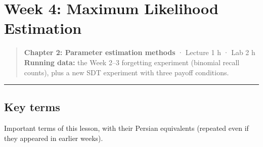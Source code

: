 \section{Week 4: Maximum Likelihood Estimation}

\begin{quote}
\textbf{Chapter 2: Parameter estimation methods} · Lecture 1 h · Lab 2 h
\textbf{Running data:} the Week 2--3 forgetting experiment (binomial
recall counts), plus a new SDT experiment with three payoff conditions.
\end{quote}

\begin{center}\rule{0.5\linewidth}{0.5pt}\end{center}

\subsection{Key terms}

Important terms of this lesson, with their Persian equivalents (repeated
even if they appeared in earlier weeks).

